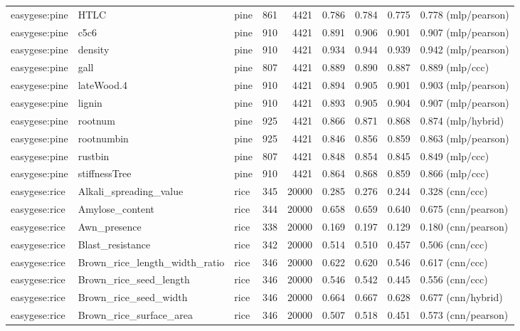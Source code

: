 \begin{longtable}{@{}p{2.25cm}p{1.35cm}p{1.85cm}rrcccp{2.7cm}@{}}
easygese:pine & HTLC & pine & 861 & 4421 & 0.786 & 0.784 & 0.775 & 0.778 (mlp/pearson) \\
easygese:pine & c5c6 & pine & 910 & 4421 & 0.891 & 0.906 & 0.901 & 0.907 (mlp/pearson) \\
easygese:pine & density & pine & 910 & 4421 & 0.934 & 0.944 & 0.939 & 0.942 (mlp/pearson) \\
easygese:pine & gall & pine & 807 & 4421 & 0.889 & 0.890 & 0.887 & 0.889 (mlp/ccc) \\
easygese:pine & lateWood.4 & pine & 910 & 4421 & 0.894 & 0.905 & 0.901 & 0.903 (mlp/pearson) \\
easygese:pine & lignin & pine & 910 & 4421 & 0.893 & 0.905 & 0.904 & 0.907 (mlp/pearson) \\
easygese:pine & rootnum & pine & 925 & 4421 & 0.866 & 0.871 & 0.868 & 0.874 (mlp/hybrid) \\
easygese:pine & rootnumbin & pine & 925 & 4421 & 0.846 & 0.856 & 0.859 & 0.863 (mlp/pearson) \\
easygese:pine & rustbin & pine & 807 & 4421 & 0.848 & 0.854 & 0.845 & 0.849 (mlp/ccc) \\
easygese:pine & stiffnessTree & pine & 910 & 4421 & 0.864 & 0.868 & 0.859 & 0.866 (mlp/ccc) \\
easygese:rice & Alkali\_\allowbreak{}spreading\_\allowbreak{}value & rice & 345 & 20000 & 0.285 & 0.276 & 0.244 & 0.328 (cnn/ccc) \\
easygese:rice & Amylose\_\allowbreak{}content & rice & 344 & 20000 & 0.658 & 0.659 & 0.640 & 0.675 (cnn/pearson) \\
easygese:rice & Awn\_\allowbreak{}presence & rice & 338 & 20000 & 0.169 & 0.197 & 0.129 & 0.180 (cnn/pearson) \\
easygese:rice & Blast\_\allowbreak{}resistance & rice & 342 & 20000 & 0.514 & 0.510 & 0.457 & 0.506 (cnn/ccc) \\
easygese:rice & Brown\_\allowbreak{}rice\_\allowbreak{}length\_\allowbreak{}width\_\allowbreak{}ratio & rice & 346 & 20000 & 0.622 & 0.620 & 0.546 & 0.617 (cnn/ccc) \\
easygese:rice & Brown\_\allowbreak{}rice\_\allowbreak{}seed\_\allowbreak{}length & rice & 346 & 20000 & 0.546 & 0.542 & 0.445 & 0.556 (cnn/ccc) \\
easygese:rice & Brown\_\allowbreak{}rice\_\allowbreak{}seed\_\allowbreak{}width & rice & 346 & 20000 & 0.664 & 0.667 & 0.628 & 0.677 (cnn/hybrid) \\
easygese:rice & Brown\_\allowbreak{}rice\_\allowbreak{}surface\_\allowbreak{}area & rice & 346 & 20000 & 0.507 & 0.518 & 0.451 & 0.573 (cnn/pearson) \\

\end{longtable}
